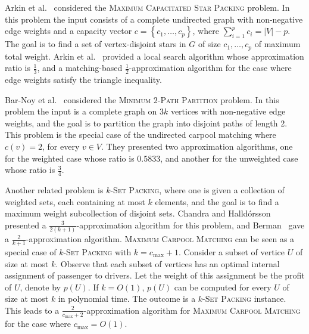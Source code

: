 \documentclass[11pt]{article}
\newcommand{\set}[1]{\left\{ #1 \right\}}
\newcommand{\abs}[1]{\left| #1 \right|}
\newcommand{\half}{\frac{1}{2}}
\newcommand{\inv}[1]{\frac{1}{#1}}
\newcommand{\carpool}{\textsc{Maximum Carpool Matching}\xspace}
\newcommand{\cmax}{c_{\max}}
\begin{document}
Arkin et al.~\cite{arkin2004approximations} considered
the \textsc{Maximum Capacitated Star Packing} problem.  In this
problem the input consists of a complete undirected graph with
non-negative edge weights and a capacity vector $c
= \set{c_1,\ldots,c_p}$, where $\sum_{i=1}^p c_i = \abs{V} - p$.  The
goal is to find a set of vertex-disjoint stars in $G$ of size
$c_1,\ldots,c_p$ of maximum total weight.  Arkin et
al.~\cite{arkin2004approximations} provided a local search algorithm
whose approximation ratio is $\inv{3}$, and a matching-based
$\half$-approximation algorithm for the case where edge weights
satisfy the triangle inequality.

Bar-Noy et al.~\cite{bar2015improved} considered the
\textsc{Minimum $2$-Path Partition} problem.
In this problem the input is a complete graph on $3k$ vertices with
non-negative edge weights, and the goal is to partition the graph into
disjoint paths of length 2.  This problem is the special case of the
undirected carpool matching where $c(v) = 2$, for every $v \in V$.
They presented two approximation algorithms, one for the weighted case
whose ratio is $0.5833$, and another for the unweighted case whose
ratio is $\frac{3}{4}$.

Another related problem is \textsc{$k$-Set Packing}, where one is
given a collection of weighted sets, each containing at most $k$
elements, and the goal is to find a maximum weight subcollection of
disjoint sets.  Chandra and Halld\'orsson~\cite{chandra2001greedy}
presented a $\frac{3}{2(k+1)}$-approximation algorithm for this
problem, and Berman~\cite{Berman00} gave a
$\frac{2}{k+1}$-approximation algorithm.
%
\carpool can be seen as a special case of \textsc{$k$-Set Packing}
with $k = \cmax + 1$.  Consider a subset of vertice $U$ of size at
most $k$.  Observe that each subset of vertices has an optimal
internal assignment of passenger to drivers.  Let the weight of this
assignment be the profit of $U$, denote by $p(U)$.  If $k = O(1)$,
$p(U)$ can be computed for every $U$ of size at most $k$ in polynomial
time.  The outcome is a \textsc{$k$-Set Packing} instance.  This leads
to a $\frac{2}{\cmax+2}$-approximation algorithm for \carpool for the
case where $\cmax = O(1)$.


\end{document}
